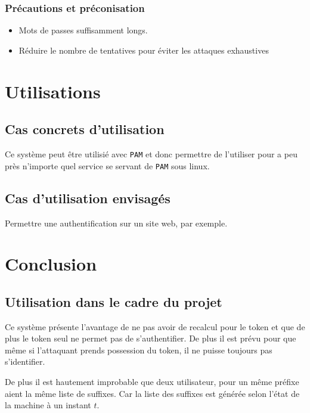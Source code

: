 \documentclass{../res/univ-projet}
\begin{document}
\subsubsection{Précautions et préconisation}
\begin{itemize}
    \item Mots de passes suffisamment longs.
    \item Réduire le nombre de tentatives pour \'eviter les attaques 
exhaustives
    
\end{itemize}

\section{Utilisations}
\subsection{Cas concrets d'utilisation}
Ce système peut être utilisi\'e avec \verb?PAM? et donc permettre
de l'utiliser pour a peu près n'importe quel service se servant de
\verb?PAM? sous linux.

\subsection{Cas d'utilisation envisagés}
Permettre une authentification sur un site web, par exemple.

\section{Conclusion}
\subsection{Utilisation dans le cadre du projet}
    Ce système pr\'esente l'avantage de ne pas avoir de recalcul pour le token
et que de plus le token seul ne permet pas de s'authentifier. De plus il est
pr\'evu pour que même si l'attaquant prends possession du token, il ne puisse
toujours pas s'identifier.

    De plus il est hautement improbable que deux utilisateur, pour un même pr\'efixe
aient la même liste de suffixes. Car la liste des suffixes est g\'en\'er\'ee selon l'\'etat
de la machine à un instant $t$.
\end{document}

